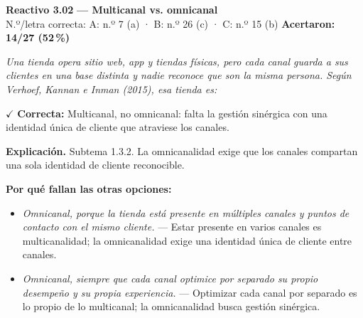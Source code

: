\documentclass[10pt,letterpaper]{article}
\begin{document}
\begin{minipage}{\textwidth}
{\color{guinda}\textbf{Reactivo 3.02}} \textbf{— Multicanal vs. omnicanal}\\[-1pt]
{\scriptsize N.º/letra correcta: A: n.º 7 (a) · B: n.º 26 (c) · C: n.º 15 (b) \hfill \textbf{Acertaron: 14/27 (52\,\%)}}

\textit{Una tienda opera sitio web, app y tiendas físicas, pero cada canal guarda a sus clientes en una base distinta y nadie reconoce que son la misma persona. Según Verhoef, Kannan e Inman (2015), esa tienda es:}

\textcolor{verde}{$\checkmark$} \textbf{Correcta:} Multicanal, no omnicanal: falta la gestión sinérgica con una identidad única de cliente que atraviese los canales.

\textbf{Explicación.} Subtema 1.3.2. La omnicanalidad exige que los canales compartan una sola identidad de cliente reconocible.

\textbf{Por qué fallan las otras opciones:}
\begin{itemize}[itemsep=0pt,topsep=1pt,leftmargin=1.3em,parsep=0pt]
\item[\textcolor{rojo}{$\times$}] \textit{Omnicanal, porque la tienda está presente en múltiples canales y puntos de contacto con el mismo cliente.} --- Estar presente en varios canales es multicanalidad; la omnicanalidad exige una identidad única de cliente entre canales.
\item[\textcolor{rojo}{$\times$}] \textit{Omnicanal, siempre que cada canal optimice por separado su propio desempeño y su propia experiencia.} --- Optimizar cada canal por separado es lo propio de lo multicanal; la omnicanalidad busca gestión sinérgica.
\end{itemize}
\end{minipage}\par\vspace{5pt}{\color{gray!40}\hrule}\vspace{5pt}
\end{document}
